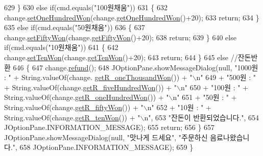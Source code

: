 \begin{DoxyCode}
629         \}
630         \textcolor{keywordflow}{else} \textcolor{keywordflow}{if}(cmd.equals(\textcolor{stringliteral}{"100원채움"}))
631         \{
632             change.\hyperlink{class_vending_machine_1_1_change_accf770f112e4a58880b90d2d2941db3d}{setOneHundredWon}(change.\hyperlink{class_vending_machine_1_1_change_ac814aaff5cfe37b1a71899f750f4d99e}{getOneHundredWon}()+20);
633             \textcolor{keywordflow}{return};
634         \}
635         \textcolor{keywordflow}{else} \textcolor{keywordflow}{if}(cmd.equals(\textcolor{stringliteral}{"50원채움"}))
636         \{
637             change.\hyperlink{class_vending_machine_1_1_change_a504308459778738b57096e5846d4a5ba}{setFiftyWon}(change.\hyperlink{class_vending_machine_1_1_change_a1ef85014ae005316e4a39db49e8364a7}{getFiftyWon}()+20);
638             \textcolor{keywordflow}{return};
639         \}
640         \textcolor{keywordflow}{else} \textcolor{keywordflow}{if}(cmd.equals(\textcolor{stringliteral}{"10원채움"}))
641         \{
642             change.\hyperlink{class_vending_machine_1_1_change_a3fb3cf3b5c93c3c52fbc7d9c6a43af00}{setTenWon}(change.\hyperlink{class_vending_machine_1_1_change_ac6b95aa923e6727f5ecf8095b7f42e99}{getTenWon}()+20);
643             \textcolor{keywordflow}{return};
644         \}
645         \textcolor{keywordflow}{else} \textcolor{comment}{//잔돈반환}
646         \{
647             change.\hyperlink{class_vending_machine_1_1_change_a8a18aaee61e801a42585bcab94aa57cf}{refund}();
648             JOptionPane.showMessageDialog(null, \textcolor{stringliteral}{"1000원 : "} + String.valueOf(change.
      \hyperlink{class_vending_machine_1_1_change_a304e4aabef0c0ff7e21b3e761489f076}{getR\_oneThousandWon}()) + \textcolor{stringliteral}{"\(\backslash\)n"}
649                     + \textcolor{stringliteral}{"500원 : "} + String.valueOf(change.\hyperlink{class_vending_machine_1_1_change_a884e656f905999d7181b680299e9c9e9}{getR\_fiveHundredWon}()) + \textcolor{stringliteral}{"\(\backslash\)n"} 
650                     + \textcolor{stringliteral}{"100원 : "} + String.valueOf(change.\hyperlink{class_vending_machine_1_1_change_a009fddaf04c554a4f3ecc9907b6a929e}{getR\_oneHundredWon}()) + \textcolor{stringliteral}{"\(\backslash\)n"}
651                     + \textcolor{stringliteral}{"50원 : "} + String.valueOf(change.\hyperlink{class_vending_machine_1_1_change_a9d9200ae5ebb4b68d5f8435a16cbc905}{getR\_fiftyWon}()) + \textcolor{stringliteral}{"\(\backslash\)n"}
652                     + \textcolor{stringliteral}{"10원 : "} + String.valueOf(change.\hyperlink{class_vending_machine_1_1_change_a61c2682e5f0b7999cb830a45a94bfc78}{getR\_tenWon}()) + \textcolor{stringliteral}{"\(\backslash\)n"},
653                     \textcolor{stringliteral}{"잔돈이 반환되었습니다."},
654                     JOptionPane.INFORMATION\_MESSAGE);
655             \textcolor{keywordflow}{return};
656         \}
657         JOptionPane.showMessageDialog(null, \textcolor{stringliteral}{"맛나게 드세요"}, \textcolor{stringliteral}{"주문하신 음료나왔습니다."}, 
658                 JOptionPane.INFORMATION\_MESSAGE);
659     \}
\end{DoxyCode}


